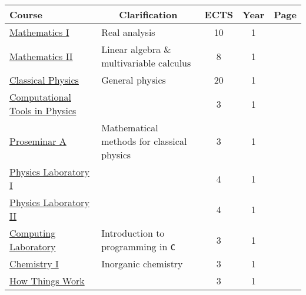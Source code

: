 \documentclass[11pt, a4paper]{article}
\begin{document}
\begin{adjustbox}{center}
    \small
    \begin{tabular}{|l|l|c|c|c|}
    \hline {\rule{0pt}{2.0ex}} \hspace{-7pt}
    \textbf{Course} & \multicolumn{1}{c}{\textbf{Clarification}} & \textbf{ECTS} & \textbf{Year} & \textbf{Page}\\
    \hline
    \hline {\rule{0pt}{2.5ex}} \hspace{-7pt}
    \hyperref[mathematics_1]{Mathematics I} & Real analysis & 10 & 1 & \pageref{mathematics_1} \\
    \hyperref[mathematics_2]{Mathematics II} & Linear algebra \& multivariable calculus & 8 & 1 & \pageref{mathematics_2} \\
    \hyperref[classical_physics]{Classical Physics} & General physics & 20 & 1 & \pageref{classical_physics} \\
    \hyperref[computational_tools_in_physics]{Computational Tools in Physics} & & 3 & 1 & \pageref{computational_tools_in_physics} \\
    \hyperref[proseminar_a]{Proseminar A} & Mathematical methods for classical physics & 3 & 1 & \pageref{proseminar_a} \\
    \hyperref[physics_laboratory_1]{Physics Laboratory I} & & 4 & 1 & \pageref{physics_laboratory_1} \\
    \hyperref[physics_laboratory_2]{Physics Laboratory II} & & 4 & 1 & \pageref{physics_laboratory_2} \\
    \hyperref[computing_laboratory]{Computing Laboratory} & Introduction to programming in \texttt{C} & 3 & 1 & \pageref{computing_laboratory} \\
    \hyperref[chemistry_1]{Chemistry I} & Inorganic chemistry & 3 & 1 & \pageref{chemistry_1} \\
    \hyperref[how_things_work]{How Things Work} & & 3 & 1 & \pageref{how_things_work} \\
    \hline
    \hline


\end{tabular}
\end{adjustbox}
\end{document}
